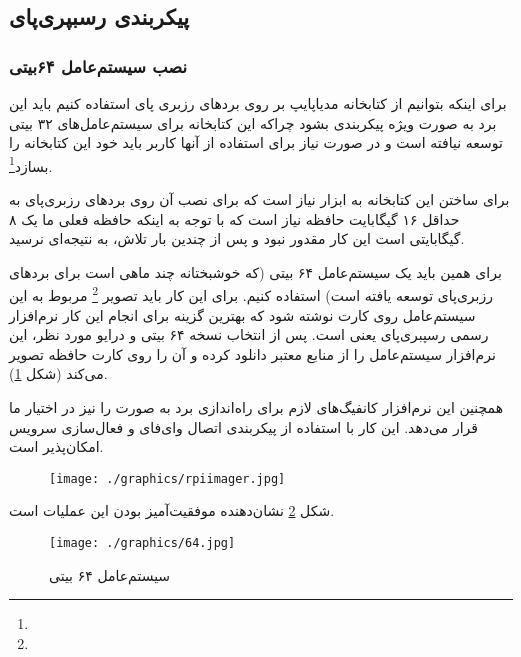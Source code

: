 \documentclass{article}
\begin{document}
\subsection{پیکربندی رسبپری‌پای}
\subsubsection{نصب سیستم‌عامل ۶۴بیتی}
برای اینکه بتوانیم از کتابخانه مدیاپایپ بر روی بردهای رزبری پای استفاده کنیم باید این برد به صورت ویژه پیکربندی بشود چراکه این کتابخانه برای سیستم‌عامل‌های ۳۲ بیتی توسعه نیافته است و در صورت نیاز برای استفاده از آنها کاربر باید خود این کتابخانه را بسازد\footnote{}.

برای ساختن این کتابخانه به ابزار  نیاز است که برای نصب آن روی برد‌های رزبری‌پای به حداقل ۱۶ گیگابایت حافظه نیاز است که با توجه به اینکه حافظه فعلی ما یک  ۸ گیگابایتی است این کار مقدور نبود و پس از چندین بار تلاش، به نتیجه‌ای نرسید.

برای همین باید یک سیستم‌عامل ۶۴ بیتی (که خوشبختانه چند ماهی ‌است برای بردهای رزبری‌پای توسعه‌ یافته است) استفاده کنیم. برای این کار باید تصویر \footnote{} مربوط به این سیستم‌عامل روی  کارت نوشته شود که بهترین گزینه برای انجام این کار نرم‌افزار رسمی رسپبری‌پای یعنی  است. پس از انتخاب نسخه ۶۴ بیتی و درایو مورد نظر، این نرم‌افزار سیستم‌عامل را از منابع معتبر دانلود کرده و آن را روی کارت حافظه تصویر می‌کند (شکل \ref{RPi Imager}).

همچنین این نرم‌افزار کانفیگ‌های لازم برای راه‌اندازی برد به صورت  را نیز در اختیار ما قرار می‌دهد. این کار با استفاده از پیکربندی اتصال وای‌فای و فعال‌سازی سرویس  امکان‌پذیر است.

\begin{figure}
	\centering
	\texttt{[image: ./graphics/rpiimager.jpg]}
	\caption{}
	\label{RPi Imager}
\end{figure}

شکل \ref{64} نشان‌دهنده موفقیت‌آمیز بودن این عملیات است.

\begin{figure}
	\centering
	\texttt{[image: ./graphics/64.jpg]}
	\caption{سیستم‌عامل ۶۴ بیتی}
	\label{64}
\end{figure}
\end{document}
